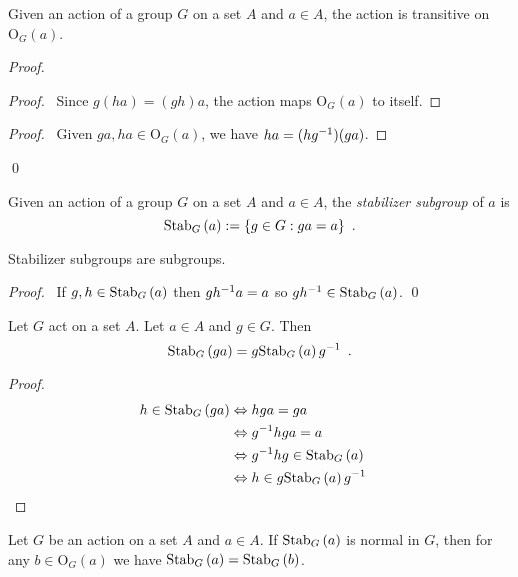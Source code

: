 \begin{prop}
Given an action of a group $G$ on a set $A$ and $a \in A$, the action is transitive on $\mathrm{O}_G(a)$.
\end{prop}

\begin{proof}
\pf
{}
\begin{proof}
\pf\ Since $g(ha) = (gh)a$, the action maps $\mathrm{O}_G(a)$ to itself.
\end{proof}
\begin{proof}
\pf\ Given $ga, ha \in \mathrm{O}_G(a)$, we have $ha = (h{g}^{-1})(ga)$.
\end{proof}
\qed
\end{proof}

\begin{df}
Given an action of a group $G$ on a set $A$ and $a \in A$, the \emph{stabilizer subgroup} of $a$ is
\[ \mathrm{Stab}_{G} \left( {a} \right) := \{ g \in G : ga = a \} \enspace . \]
\end{df}

\begin{prop}
Stabilizer subgroups are subgroups.
\end{prop}

\begin{proof}
\pf\ If $g,h \in \mathrm{Stab}_{G} \left( {a} \right)$ then $g {h}^{-1} a = a$ so $g {h}^{-1} \in \mathrm{Stab}_{G} \left( {a} \right)$. \qed
\end{proof}

\begin{prop}
Let $G$ act on a set $A$. Let $a \in A$ and $g \in G$. Then
\[ \mathrm{Stab}_{G} \left( {ga} \right) = g \mathrm{Stab}_{G} \left( {a} \right) {g}^{-1} \enspace . \]
\end{prop}

\begin{proof}
\pf
\begin{align*}
h \in \mathrm{Stab}_{G} \left( {ga} \right) & \Leftrightarrow hga = ga \\
& \Leftrightarrow {g}^{-1}hga = a \\
& \Leftrightarrow {g}^{-1}hg \in \mathrm{Stab}_{G} \left( {a} \right) \\
& \Leftrightarrow h \in g \mathrm{Stab}_{G} \left( {a} \right) {g}^{-1} & \relax
\end{align*}
\end{proof}

\begin{cor}
Let $G$ be an action on a set $A$ and $a \in A$. If $\mathrm{Stab}_{G} \left( {a} \right)$ is normal in $G$, then for any $b \in \mathrm{O}_G(a)$ we have $\mathrm{Stab}_{G} \left( {a} \right) = \mathrm{Stab}_{G} \left( {b} \right)$.
\end{cor}

